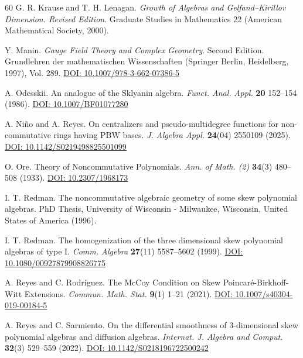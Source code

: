 \documentclass{amsart}
\theoremstyle{definition}
\theoremstyle{remark}
\numberwithin{equation}{section}
\begin{document}
\begin{thebibliography}{60}
 G. R. Krause and T. H. Lenagan. {\em Growth of Algebras and Gelfand–Kirillov Dimension. Revised Edition}. Graduate Studies in Mathematics 22 (American Mathematical Society, 2000).

 Y. Manin. {\em Gauge Field Theory and Complex Geometry}.  Second Edition. Grundlehren der mathematischen Wissenschaften (Springer Berlin, Heidelberg, 1997), Vol. 289. \href{https://doi.org/10.1007/978-3-662-07386-5}{DOI: 10.1007/978-3-662-07386-5}

 A. Odesskii. An analogue of the Sklyanin algebra. {\em Funct. Anal. Appl.} {\bf 20} 152--154 (1986). \href{https://doi.org/10.1007/BF01077280}{DOI: 10.1007/BF01077280}
 
 A. Ni\~no and A. Reyes. On centralizers and pseudo-multidegree functions for \linebreak non-commutative rings having PBW bases. {\em J. Algebra Appl.} {\bf 24}(04) 2550109 (2025). \linebreak \href{https://doi.org/10.1142/S0219498825501099}{DOI: 10.1142/S0219498825501099}

 O. Ore. Theory of Noncommutative Polynomials. {\em Ann. of Math. (2)} {\bf 34}(3) 480--508 (1933). \href{https://doi.org/10.2307/1968173}{DOI: 10.2307/1968173}

 I. T. Redman. The noncommutative algebraic geometry of some skew polynomial algebras. PhD Thesis, University of Wisconsin - Milwaukee, Wisconsin, United States of America (1996).

 I. T. Redman. The homogenization of the three dimensional skew polynomial algebras of type I. {\em Comm. Algebra} {\bf 27}(11) 5587--5602 (1999). \href{https://doi.org/10.1080/00927879908826775}{DOI: 10.1080/00927879908826775}

 A. Reyes and C. Rodr\'iguez. The McCoy Condition on Skew Poincar\'e-Birkhoff-Witt Extensions. {\em Commun. Math. Stat.} {\bf 9}(1) 1--21 (2021). \href{https://doi.org/10.1007/s40304-019-00184-5}{DOI: 10.1007/s40304-019-00184-5}

 A. Reyes and C. Sarmiento. On the differential smoothness of 3-dimensional skew polynomial algebras and diffusion algebras. {\em Internat. J. Algebra and Comput.} {\bf 32}(3) 529--559 (2022). \href{https://doi.org/10.1142/S0218196722500242}{DOI: 10.1142/S0218196722500242}


\end{thebibliography}
\end{document}
